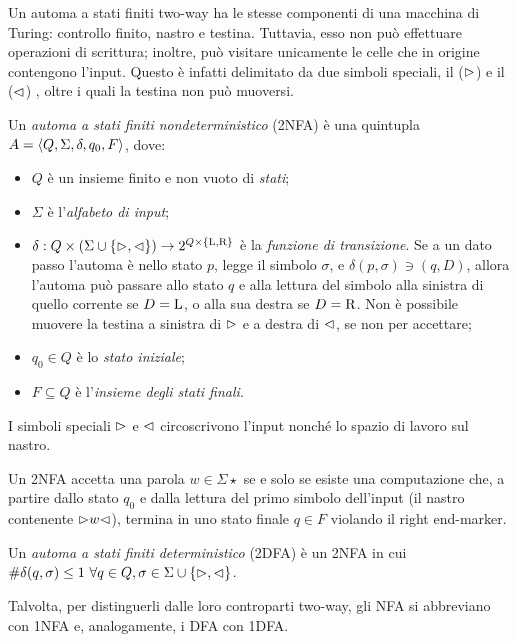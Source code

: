 Un automa a stati finiti two-way ha le stesse componenti di una macchina di Turing: controllo finito, nastro e testina. Tuttavia, esso non può effettuare operazioni di scrittura; inoltre, può visitare unicamente le celle che in origine contengono l'input. Questo è infatti delimitato da due simboli speciali, il  ($\rhd$) e il  ($\lhd$) , oltre i quali la testina non può muoversi.
\begin{defin}
	Un \emph{automa a stati finiti  nondeterministico} (2NFA) è una quintupla $A=\langle Q,\Sigma,\delta,q_0,F \rangle$, dove:
	\begin{itemize}
		\item $Q$ è un insieme finito e non vuoto di \emph{stati};
		\item $\Sigma$ è l'\emph{alfabeto di input};
		\item $\delta:Q\times(\Sigma\cup\left\{ \rhd,\lhd \right\})\to2^{Q\times\left\{ \mathrm L,\mathrm R \right\}}$ è la \emph{funzione di transizione}. Se a un dato passo l'automa è nello stato $p$, legge il simbolo $\sigma$, e $\delta(p,\sigma)\ni (q,D)$, allora l'automa può passare allo stato $q$ e alla lettura del simbolo alla sinistra di quello corrente se $D=\mathrm L$, o alla sua destra se $D=\mathrm R$. Non è possibile muovere la testina a sinistra di $\rhd$ e a destra di $\lhd$, se non per accettare;
		\item $q_0\in Q$ è lo \emph{stato iniziale};
		\item $F\subseteq Q$ è l'\emph{insieme degli stati finali}.
	\end{itemize}
	I simboli speciali $\rhd$ e $\lhd$ circoscrivono l'input nonché lo spazio di lavoro sul nastro.

	Un 2NFA accetta una parola $w\in\Sigma\star$ se e solo se esiste una computazione che, a partire dallo stato $q_0$ e dalla lettura del primo simbolo dell'input (il nastro contenente $\rhd w\lhd$), termina in uno stato finale $q\in F$ violando il right end-marker.
\end{defin}

\begin{defin}
	Un \emph{automa a stati finiti  deterministico} (2DFA) è un 2NFA in cui $\# \delta(q,\sigma)\leq 1 ~ \forall q\in Q,\sigma\in\Sigma\cup\left\{ \rhd,\lhd \right\}$.
\end{defin}

Talvolta, per distinguerli dalle loro controparti two-way, gli NFA  si abbreviano con 1NFA e, analogamente, i DFA con 1DFA.


